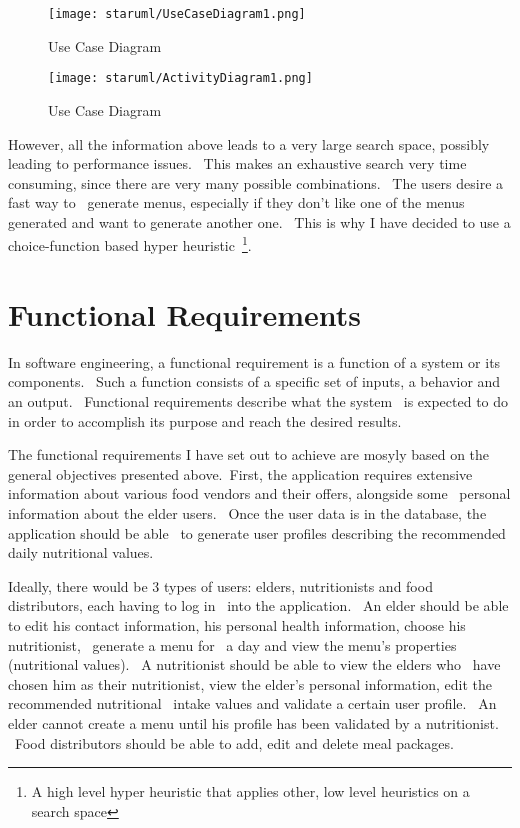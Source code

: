 \begin{figure}[ht]
    \label{fig:usecase1}
    \texttt{[image: staruml/UseCaseDiagram1.png]}
    \caption{Use Case Diagram}
\end{figure}

\begin{figure}[ht]
    \label{fig:activity1}
    \texttt{[image: staruml/ActivityDiagram1.png]}
    \caption{Use Case Diagram}
\end{figure}

However, all the information above leads to a very large search space, possibly leading to performance issues. \
This makes an exhaustive search very time consuming, since there are very many possible combinations. \
The users desire a fast way to \
generate menus, especially if they don't like one of the menus generated and want to generate another one. \
This is why I have decided to use a choice-function based hyper heuristic\
\footnote{A high level hyper heuristic that applies other, low level heuristics on a search space}.


\section{Functional Requirements}
\label{sec:specification-functional}

In software engineering, a functional requirement is a function of a system or its components. \
Such a function consists of a specific set of inputs, a behavior and an output. \
Functional requirements describe what the system \
is expected to do in order to accomplish its purpose and reach the desired results.

The functional requirements I have set out to achieve are mosyly based on the general objectives presented above.\
First, the application requires extensive information about various food vendors and their offers, alongside some \
personal information about the elder users. \
Once the user data is in the database, the application should be able \
to generate user profiles describing the recommended daily nutritional values.

Ideally, there would be 3 types of users: elders, nutritionists and food distributors, each having to log in \
into the application. \
An elder should be able to edit his contact information, his personal health information, choose his nutritionist, \
generate a menu for \
a day and view the menu's properties (nutritional values). \
A nutritionist should be able to view the elders who \
have chosen him as their nutritionist, view the elder's personal information, edit the recommended nutritional \
intake values and validate a certain user profile. \
An elder cannot create a menu until his profile has been validated by a nutritionist. \
Food distributors should be able to add, edit and delete meal packages.

